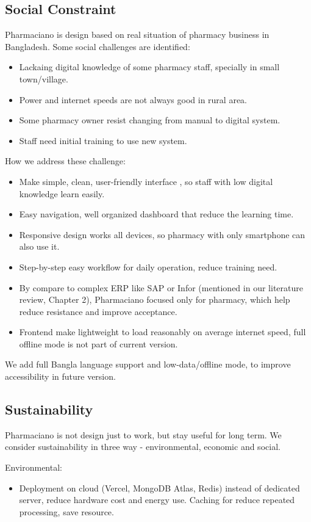 \subsection{Social Constraint}
Pharmaciano is design based on real situation of pharmacy business in Bangladesh.
Some social challenges are identified:
\begin{itemize}
\item Lackaing digital knowledge of some pharmacy staff, specially in small town/village.
\item Power and internet speeds are not always good in rural area.
\item Some pharmacy owner resist changing from manual to digital system.
\item Staff need initial training to use new system.
\end{itemize}
How we address these challenge:
\begin{itemize}
\item Make simple, clean, user-friendly interface , so staff with low digital knowledge learn easily.
\item Easy navigation, well organized dashboard that reduce the learning time.
\item Responsive design works all devices, so pharmacy with only smartphone can also use it.
\item Step-by-step easy workflow for daily operation, reduce training need.
\item By compare to complex ERP like SAP or Infor (mentioned in our literature review, Chapter 2), Pharmaciano focused only for pharmacy, which help reduce resistance and improve acceptance.
\item Frontend make lightweight to load reasonably on average internet speed, full offline mode is not part of current version.
\end{itemize}
We add full Bangla language support and low-data/offline mode, to improve accessibility in future version.

\subsection{Sustainability}
Pharmaciano is not design just to work, but stay useful for long term. We consider sustainability in three way - environmental, economic and social.

Environmental:
\begin{itemize}
\item Deployment on cloud (Vercel, MongoDB Atlas, Redis) instead of dedicated server, reduce hardware cost and energy use.
Caching for reduce repeated processing, save resource.
\end{itemize}

